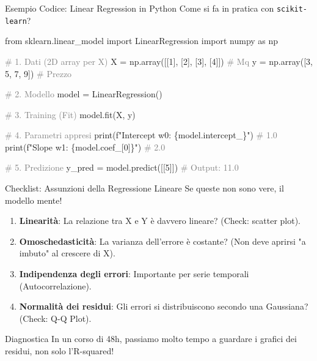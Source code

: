 \documentclass[aspectratio=169, 10pt]{beamer}
\begin{document}
\begin{frame}[fragile]{Esempio Codice: Linear Regression in Python}
    Come si fa in pratica con \texttt{scikit-learn}?
    
\begin{semiverbatim}
\small
\textcolor{Secondary}{from} sklearn.linear_model \textcolor{Secondary}{import} LinearRegression
\textcolor{Secondary}{import} numpy \textcolor{Secondary}{as} np

\textcolor{gray}{# 1. Dati (2D array per X)}
X = np.array([[1], [2], [3], [4]])  \textcolor{gray}{# Mq}
y = np.array([3, 5, 7, 9])          \textcolor{gray}{# Prezzo}

\textcolor{gray}{# 2. Modello}
model = LinearRegression()

\textcolor{gray}{# 3. Training (Fit)}
model.fit(X, y)

\textcolor{gray}{# 4. Parametri appresi}
print(f"Intercept w0: \{model.intercept_\}")  \textcolor{gray}{# 1.0}
print(f"Slope w1: \{model.coef_[0]\}")         \textcolor{gray}{# 2.0}

\textcolor{gray}{# 5. Predizione}
y_pred = model.predict([[5]])  \textcolor{gray}{# Output: 11.0}
\end{semiverbatim}
\end{frame}

\begin{frame}{Checklist: Assunzioni della Regressione Lineare}
    Se queste non sono vere, il modello mente!
    
    \begin{enumerate}
        \item \textbf{Linearità}: La relazione tra X e Y è davvero lineare? (Check: scatter plot).
        \item \textbf{Omoschedasticità}: La varianza dell'errore è costante? (Non deve aprirsi "a imbuto" al crescere di X).
        \item \textbf{Indipendenza degli errori}: Importante per serie temporali (Autocorrelazione).
        \item \textbf{Normalità dei residui}: Gli errori si distribuiscono secondo una Gaussiana? (Check: Q-Q Plot).
    \end{enumerate}
    
    \vspace{0.5em}
    \begin{alertblock}{Diagnostica}
        In un corso di 48h, passiamo molto tempo a guardare i grafici dei residui, non solo l'R-squared!
    \end{alertblock}
\end{frame}
\end{document}
